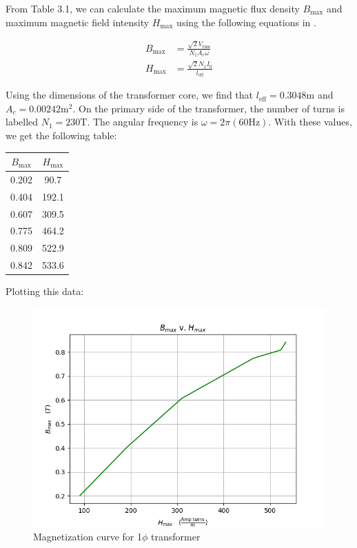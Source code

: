 \documentclass{IEEEtran}
\begin{document}
From Table 3.1, we can calculate the maximum magnetic flux density \(  B_{\text{max}} \) and maximum magnetic field intensity \(H_{\text{max}}\) using the following equations in \cite{labmanual}.

\begin{align}
    B_{\text{max}} &= \frac{\sqrt{2} V_{\text{rms}}}{N_1 A_c \omega} \\
    H_{\text{max}} &= \frac{\sqrt{2} N_1 I_0}{l_{\text{eff}}}
\end{align}

Using the dimensions of the transformer core, we find that \(l_{\text{eff}} = 0.3048 \text{m}\) and \(A_c = 0.00242 \text{m}^2\). On the primary side of the transformer, the number of turns is labelled \(N_1 = 230 \text{T}\). The angular frequency is \(\omega = 2\pi (60 \text{Hz})\). With these values, we get the following table:

\begin{center}
\begin{tabular}{ |c|c| }
    \hline
    \(B_{\text{max}}\) & \(H_{\text{max}}\) \\
    \hline
    0.202 & 90.7 \\
    \hline
    0.404 & 192.1 \\
    \hline
    0.607 & 309.5 \\
    \hline
    0.775 & 464.2 \\
    \hline
    0.809 & 522.9  \\
    \hline
    0.842 & 533.6  \\
    \hline
\end{tabular}
\end{center}


\newpage
Plotting this data:

\begin{figure}[h!]
    \includegraphics[width=\columnwidth]{bh-plot.png}
    \caption{Magnetization curve for 1\(\phi\) transformer} 
    \label{fig:bh-og}
\end{figure}
\end{document}

